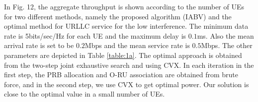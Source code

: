 \documentclass[lettersize,journal]{IEEEtran}
\begin{document}
In Fig. 12, the aggregate throughput is shown according to the number of UEs for two different methods, namely the
proposed algorithm (IABV) and the optimal method for URLLC service for the low interference.
The minimum data rate is 5bits/sec/Hz for each UE and the maximum delay is $0.1$ms.
Also the mean arrival rate is set to be $0.2$Mbps and the mean service rate is $0.5$Mbps.
The other parameters are depicted in Table \ref{table:1a}.
The optimal approach is obtained from the two-step joint exhaustive search and using CVX.
In each iteration in the first step, the PRB allocation and O-RU association are obtained from brute force, and in the second step, we use CVX to get optimal power.
Our solution is close to the optimal value in a small number of UEs.
\end{document}

